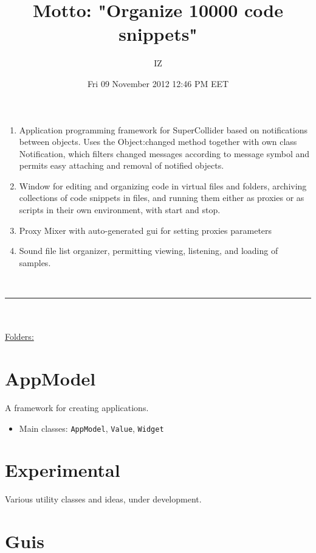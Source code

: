 \documentclass[11pt, a4paper]{scrartcl}
\begin{document}
\title{Motto: "Organize 10000 code snippets"}
\author{IZ}
\date{Fri 09 November 2012 12:46 PM EET}
\maketitle

\setcounter{tocdepth}{3}
\tableofcontents
\vspace*{1cm}


\begin{enumerate}
\item Application programming framework for SuperCollider based on notifications between objects. Uses the Object:changed method together with own class Notification, which filters changed messages according to message symbol and permits easy attaching and removal of notified objects.
\item Window for editing and organizing code in virtual files and folders, archiving collections of code snippets in files, and running them either as proxies or as scripts in their own environment, with start and stop.
\item Proxy Mixer with auto-generated gui for setting proxies parameters
\item Sound file list organizer, permitting viewing, listening, and loading of samples.
\end{enumerate}
\\
\hrule
\\
\\
\underline{Folders:}

\section{AppModel}
\label{sec-1}


A framework for creating applications. 

\begin{itemize}
\item Main classes: \texttt{AppModel}, \texttt{Value}, \texttt{Widget}
\end{itemize}
\section{Εxperimental}
\label{sec-2}


Various utility classes and ideas, under development.
\section{Guis}
\label{sec-3}
\end{document}
